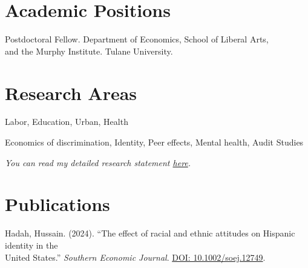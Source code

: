 \documentclass[letterpaper]{article}
\renewenvironment{itemize}{
  \begin{list}{}{
    \setlength{\leftmargin}{1.5em}
  }
}{
  \end{list}
}
\begin{document}
\section*{Academic Positions}
\vspace{2 mm}
\begin{itemize}
  \item {} Postdoctoral Fellow. Department of Economics, School of Liberal Arts, \\{\makebox[1.8cm]{\hfill}} and the Murphy Institute. Tulane University.
\end{itemize}
\vspace{2 mm}

\section*{Research Areas}
\vspace{2 mm}
\begin{itemize}
\item {} Labor, Education, Urban, Health
\item {} Economics of discrimination, Identity, Peer effects, Mental health, Audit Studies
\item \textit{You can read my detailed research statement \href{https://hhadah.github.io/statements/Hadah_Research.pdf}{here}.}
\end{itemize}
\vspace{2 mm}

\section*{Publications}
\vspace{2 mm}
\begin{itemize}
    \item     \item Hadah, Hussain. (2024). ``The effect of racial and ethnic attitudes on Hispanic identity in the \\ 
    \makebox[4mm]{} United States.'' \textit{Southern Economic Journal}. \href{https://doi.org/10.1002/soej.12749}{DOI: 10.1002/soej.12749}.
\end{itemize}
\vspace{2 mm}
\end{document}
